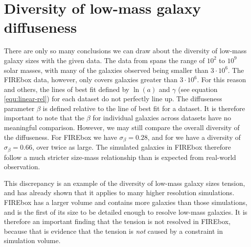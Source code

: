 \section{Diversity of low-mass galaxy diffuseness}

There are only so many conclusions we can draw about the diversity of low-mass galaxy sizes with the given data. The data from \cite{mcconnachieOBSERVEDPROPERTIESDWARF2012} spans the range of $10^2$ to $10^9$ solar masses, with many of the galaxies observed being smaller than $3 \cdot 10^6$. The FIREbox data, however, only covers galaxies greater than $3 \cdot 10^6$. For this reason and others, the lines of best fit defined by $\ln(a)$ and $\gamma$ (see equation \ref{equ:linear-rel}) for each dataset do not perfectly line up. %
The diffuseness parameter $\beta$ is defined relative to the line of best fit for a dataset. It is therefore important to note that the $\beta$ for individual galaxies across datasets have no meaningful comparison. However, we may still compare the overall diversity of the diffuseness. For FIREbox we have $\sigma_\beta = 0.28$, and for \cite{mcconnachieOBSERVEDPROPERTIESDWARF2012} we have a diversity of $\sigma_\beta = 0.66$, over twice as large. The simulated galaxies in FIREbox therefore follow a much stricter size-mass relationship than is expected from real-world observation.

This discrepancy is an example of the diversity of low-mass galaxy sizes tension, and \cite{salesBaryonicSolutionsChallenges2022} has already shown that it applies to many higher resolution simulations. FIREbox has a larger volume and contains more galaxies than those simulations, and is the first of its size to be detailed enough to resolve low-mass galaxies. It is therefore an important finding that the tension is not resolved in FIREbox, because that is evidence that the tension is \emph{not} caused by a constraint in simulation volume.


